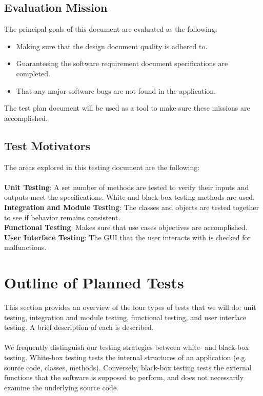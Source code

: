 \documentclass[table]{scrreprt}
\begin{document}
    \section{Evaluation Mission}
    The principal goals of this document are evaluated as the following:
    \begin{itemize}
    \item Making sure that the design document quality is adhered to.
    \item Guaranteeing the software requirement document specifications are completed.
    \item That any major software bugs are not found in the application.
    \end{itemize}
    
    The test plan document will be used as a tool to make sure these missions are accomplished.
    
\newpage 

    \section{Test Motivators}
    The areas explored in this testing document are the following:
\\    \\
    \textbf{Unit Testing}: A set number of methods are tested to verify their inputs and outputs meet the specifications. White and black box testing methods are used.\\
    \textbf{Integration and Module Testing}: The classes and objects are tested together to see if behavior remains consistent. \\
    \textbf{Functional Testing}: Makes sure that use cases objectives are accomplished.
    \newline
    \textbf{User Interface Testing}: The GUI that the user interacts with is checked for malfunctions. 
    
    \chapter{Outline of Planned Tests}

    This section provides an overview of the four types of tests that we will do: unit testing, integration and module testing, functional testing, and user interface testing. A brief description of each is described. \\ \\
    We frequently distinguish our testing strategies between white- and black-box testing. White-box testing tests the internal structures of an application (e.g. source code, classes, methods). Conversely, black-box testing tests the external functions that the software is supposed to perform, and does not necessarily examine the underlying source code.
\end{document}
